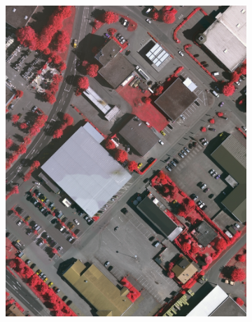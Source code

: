 \begin{figure}[htb]
\begin{subfigure}{0.19\textwidth}
  \centering
  \includegraphics[width=1\linewidth]{fig/vai/32_irg.JPG}
\end{subfigure}\vspace{1mm}
\begin{subfigure}{0.19\textwidth}
  \centering

\end{subfigure}
\end{figure}
